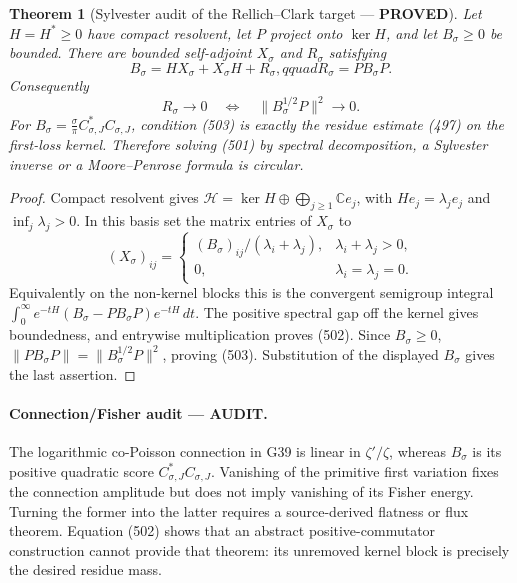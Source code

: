 \documentclass[11pt]{article}
\newtheorem{theorem}{Theorem}
\newcommand{\PROVED}{\textcolor{green!45!black}{\textbf{PROVED}}}
\newcommand{\AUDIT}{\textcolor{orange!75!black}{\textbf{AUDIT}}}
\begin{document}
\begin{theorem}[Sylvester audit of the Rellich--Clark target --- \PROVED]
Let \(H=H^*\ge0\) have compact resolvent, let \(P\) project onto
\(\ker H\), and let \(B_\sigma\ge0\) be bounded.  There are bounded
self-adjoint \(X_\sigma\) and \(R_\sigma\) satisfying
\begin{equation}
 B_\sigma=HX_\sigma+X_\sigma H+R_\sigma,qquad
 R_\sigma=PB_\sigma P.                              \tag{502}
\end{equation}
Consequently
\begin{equation}
 R_\sigma\longrightarrow0
 \quad\Longleftrightarrow\quad
 \|B_\sigma^{1/2}P\|^2\longrightarrow0.             \tag{503}
\end{equation}
For
\(B_\sigma=\frac{\sigma}{\pi}C_{\sigma,J}^*C_{\sigma,J}\), condition
(503) is exactly the residue estimate (497) on the first-loss kernel.
Therefore solving (501) by spectral decomposition, a Sylvester inverse or a
Moore--Penrose formula is circular.
\end{theorem}

\begin{proof}
Compact resolvent gives
\(\mathcal H=\ker H\oplus\bigoplus_{j\ge1}\mathbb Ce_j\), with
\(He_j=\lambda_je_j\) and \(\inf_j\lambda_j>0\).  In this basis set the
matrix entries of \(X_\sigma\) to
\begin{equation}
 (X_\sigma)_{ij}=
 \begin{cases}
 (B_\sigma)_{ij}/(\lambda_i+\lambda_j),
   &\lambda_i+\lambda_j>0,\\
 0,&\lambda_i=\lambda_j=0.
 \end{cases}                                        \tag{504}
\end{equation}
Equivalently on the non-kernel blocks this is the convergent semigroup
integral
\(\int_0^\infty e^{-tH}(B_\sigma-PB_\sigma P)e^{-tH}\,dt\).
The positive spectral gap off the kernel gives boundedness, and entrywise
multiplication proves (502).  Since \(B_\sigma\ge0\),
\(\|PB_\sigma P\|=\|B_\sigma^{1/2}P\|^2\), proving (503).  Substitution of
the displayed \(B_\sigma\) gives the last assertion.
\end{proof}

\paragraph{Connection/Fisher audit --- \AUDIT.}
The logarithmic co-Poisson connection in G39 is linear in
\(\zeta'/\zeta\), whereas \(B_\sigma\) is its positive quadratic score
\(C_{\sigma,J}^*C_{\sigma,J}\).  Vanishing of the primitive first variation
fixes the connection amplitude but does not imply vanishing of its Fisher
energy.  Turning the former into the latter requires a source-derived
flatness or flux theorem.  Equation (502) shows that an abstract
positive-commutator construction cannot provide that theorem: its unremoved
kernel block is precisely the desired residue mass.
\end{document}
